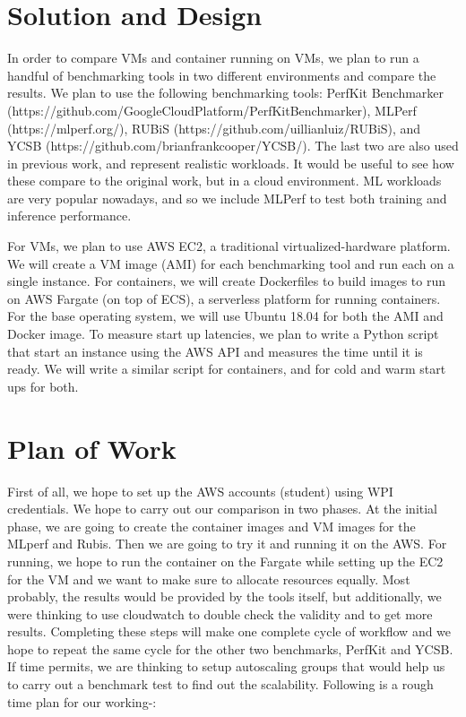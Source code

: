 \documentclass[11pt]{article}
\begin{document}
\section{Solution and Design}

In order to compare VMs and container running on VMs, we plan to run a handful of benchmarking tools in two different environments and compare the results. We plan to use the following benchmarking tools: PerfKit Benchmarker (https://github.com/GoogleCloudPlatform/PerfKitBenchmarker), MLPerf (https://mlperf.org/), RUBiS (https://github.com/uillianluiz/RUBiS), and YCSB (https://github.com/brianfrankcooper/YCSB/). The last two are also used in previous work, and represent realistic workloads. It would be useful to see how these compare to the original work, but in a cloud environment. ML workloads are very popular nowadays, and so we include MLPerf to test both training and inference performance.

For VMs, we plan to use AWS EC2, a traditional virtualized-hardware platform. We will create a VM image (AMI) for each benchmarking tool and run each on a single instance.  For containers, we will create Dockerfiles to build images to run on AWS Fargate (on top of ECS), a serverless platform for running containers. For the base operating system, we will use Ubuntu 18.04 for both the AMI and Docker image. To measure start up latencies, we plan to write a Python script that start an instance using the AWS API and measures the time until it is ready. We will write a similar script for containers, and for cold and warm start ups for both.

\section{Plan of Work}


First of all, we hope to set up the AWS accounts (student) using WPI credentials. We hope to carry out our comparison in two phases. At the initial phase, we are going to create the container images and VM images for the MLperf and Rubis. Then we are going to try it and running it on the AWS. For running, we hope to run the container on the Fargate while setting up the EC2 for the VM and we want to make sure to allocate resources equally. Most probably, the results would be provided by the tools itself, but additionally, we were thinking to use cloudwatch to double check the validity and to get more results. Completing these steps will make one complete cycle of workflow and we hope to repeat the same cycle for the other two benchmarks, PerfKit and YCSB. If time permits, we are thinking to setup autoscaling groups that would help us to carry out a benchmark test to find out the scalability. Following is a rough time plan for our working-: 
\end{document}
